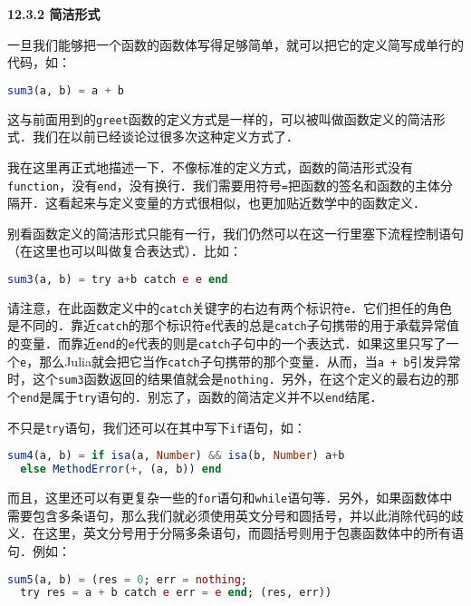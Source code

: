 \textbf{12.3.2 简洁形式}

一旦我们能够把一个函数的函数体写得足够简单，就可以把它的定义简写成单行的代码，如：

\begin{lstlisting}[language=julia]
sum3(a, b) = a + b
\end{lstlisting}

这与前面用到的\verb|greet|函数的定义方式是一样的，可以被叫做函数定义的简洁形式．我们在以前已经谈论过很多次这种定义方式了．
 
我在这里再正式地描述一下．不像标准的定义方式，函数的简洁形式没有\verb|function|，没有\verb|end|，没有换行．我们需要用符号\verb|=|把函数的签名和函数的主体分隔开．这看起来与定义变量的方式很相似，也更加贴近数学中的函数定义．

别看函数定义的简洁形式只能有一行，我们仍然可以在这一行里塞下流程控制语句（在这里也可以叫做复合表达式）．比如：

\begin{lstlisting}[language=julia]
sum3(a, b) = try a+b catch e e end
\end{lstlisting}

请注意，在此函数定义中的\verb|catch|关键字的右边有两个标识符\verb|e|．它们担任的角色是不同的．靠近\verb|catch|的那个标识符\verb|e|代表的总是\verb|catch|子句携带的用于承载异常值的变量．而靠近\verb|end|的\verb|e|代表的则是\verb|catch|子句中的一个表达式．如果这里只写了一个\verb|e|，那么Julia就会把它当作\verb|catch|子句携带的那个变量．从而，当\verb|a + b|引发异常时，这个\verb|sum3|函数返回的结果值就会是\verb|nothing|．另外，在这个定义的最右边的那个\verb|end|是属于\verb|try|语句的．别忘了，函数的简洁定义并不以\verb|end|结尾．

不只是\verb|try|语句，我们还可以在其中写下\verb|if|语句，如：

\begin{lstlisting}[language=julia]
sum4(a, b) = if isa(a, Number) && isa(b, Number) a+b
  else MethodError(+, (a, b)) end 
\end{lstlisting}

而且，这里还可以有更复杂一些的\verb|for|语句和\verb|while|语句等．另外，如果函数体中需要包含多条语句，那么我们就必须使用英文分号和圆括号，并以此消除代码的歧义．在这里，英文分号用于分隔多条语句，而圆括号则用于包裹函数体中的所有语句．例如：

\begin{lstlisting}[language=julia]
sum5(a, b) = (res = 0; err = nothing;
  try res = a + b catch e err = e end; (res, err))
\end{lstlisting}

